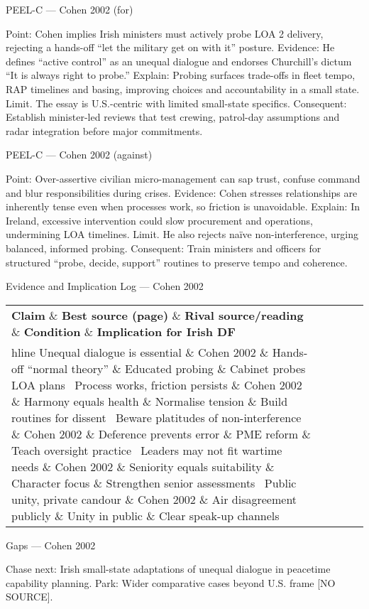 PEEL-C — Cohen 2002 (for)

Point: Cohen implies Irish ministers must actively probe LOA 2 delivery, rejecting a hands-off “let the military get on with it” posture.
Evidence: He defines “active control” as an unequal dialogue and endorses Churchill’s dictum “It is always right to probe.”
Explain: Probing surfaces trade-offs in fleet tempo, RAP timelines and basing, improving choices and accountability in a small state.
Limit. The essay is U.S.-centric with limited small-state specifics.
Consequent: Establish minister-led reviews that test crewing, patrol-day assumptions and radar integration before major commitments.

PEEL-C — Cohen 2002 (against)

Point: Over-assertive civilian micro-management can sap trust, confuse command and blur responsibilities during crises.
Evidence: Cohen stresses relationships are inherently tense even when processes work, so friction is unavoidable.
Explain: In Ireland, excessive intervention could slow procurement and operations, undermining LOA timelines.
Limit. He also rejects naïve non-interference, urging balanced, informed probing.
Consequent: Train ministers and officers for structured “probe, decide, support” routines to preserve tempo and coherence.

Evidence and Implication Log — Cohen 2002

\begin{tabular}{p{3.2cm}p{4.2cm}p{3.6cm}p{3.2cm}p{4.2cm}}
	\textbf{Claim} \& \textbf{Best source (page)} \& \textbf{Rival source/reading} \& \textbf{Condition} \& \textbf{Implication for Irish DF}\\hline
	Unequal dialogue is essential \& Cohen 2002 \& Hands-off “normal theory” \& Educated probing \& Cabinet probes LOA plans \
	Process works, friction persists \& Cohen 2002 \& Harmony equals health \& Normalise tension \& Build routines for dissent \
	Beware platitudes of non-interference \& Cohen 2002 \& Deference prevents error \& PME reform \& Teach oversight practice \
	Leaders may not fit wartime needs \& Cohen 2002 \& Seniority equals suitability \& Character focus \& Strengthen senior assessments \
	Public unity, private candour \& Cohen 2002 \& Air disagreement publicly \& Unity in public \& Clear speak-up channels \
\end{tabular}

Gaps — Cohen 2002

Chase next: Irish small-state adaptations of unequal dialogue in peacetime capability planning.
Park: Wider comparative cases beyond U.S. frame [NO SOURCE].

